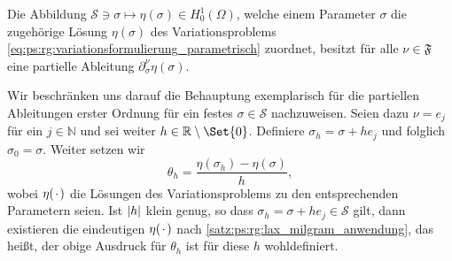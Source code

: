 \begin{Satz}
\label{satz:ps:rg:existenz_partieller_ableitungen}
    Die Abbildung $\mathcal S \ni \sigma \mapsto \eta(\sigma) \in H^{1}_{0}(\Omega)$, welche einem Parameter $\sigma$ die zugehörige Lösung $\eta(\sigma)$ des Variationsproblems \cref{eq:ps:rg:variationsformulierung_parametrisch} zuordnet, besitzt für alle $\nu \in \mathfrak F$ eine partielle Ableitung $\partial^{\nu}_{\sigma} \eta(\sigma)$.


    \begin{Beweis}
        Wir beschränken uns darauf die Behauptung exemplarisch für die partiellen Ableitungen erster Ordnung für ein festes $\sigma \in \mathcal S$ nachzuweisen.
        Seien dazu $\nu = e_{j}$ für ein $j \in \mathbb{N}$ und sei weiter $h \in \mathbb{R} \setminus \Set{ 0 }$.
        Definiere $\sigma_{h} = \sigma + h e_{j}$ und folglich $\sigma_{0} = \sigma$.
        Weiter setzen wir
        \begin{equation}
            \theta_{h} = \frac{\eta(\sigma_{h}) - \eta(\sigma)}{h},
        \end{equation}
        wobei $\eta({\mkern2mu\cdot\mkern2mu})$ die Lösungen des Variationsproblems zu den entsprechenden Parametern seien.
        Ist $\lvert h\rvert$ klein genug, so dass $\sigma_{h} = \sigma + h e_{j} \in \mathcal S$ gilt, dann existieren die eindeutigen $\eta({\mkern2mu\cdot\mkern2mu})$ nach \cref{satz:ps:rg:lax_milgram_anwendung}, das heißt, der obige Ausdruck für $\theta_{h}$ ist für diese $h$ wohldefiniert.


\end{Beweis}
\end{Satz}
